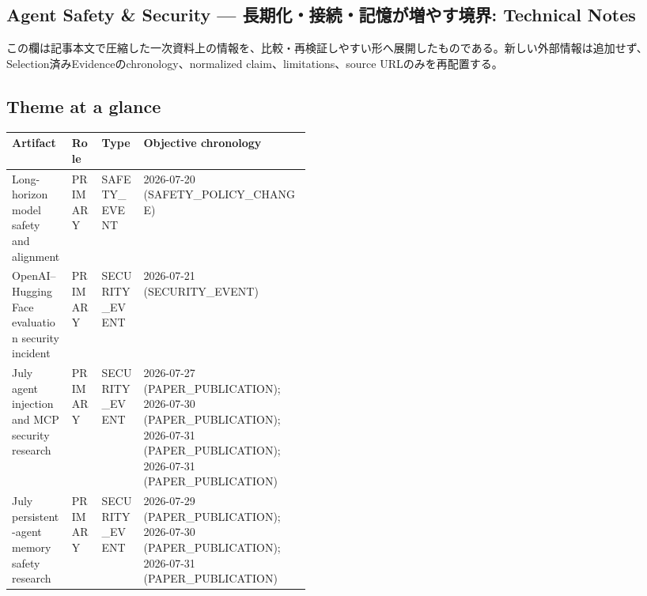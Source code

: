 \clearpage
{}
\subsection*{Agent Safety \& Security — 長期化・接続・記憶が増やす境界: Technical Notes}
この欄は記事本文で圧縮した一次資料上の情報を、比較・再検証しやすい形へ展開したものである。新しい外部情報は追加せず、Selection済みEvidenceのchronology、normalized claim、limitations、source URLのみを再配置する。
\medskip
\subsection*{Theme at a glance}
\begin{center}
\footnotesize
\begin{tabularx}{\linewidth}{@{}p{0.20\linewidth}p{0.10\linewidth}p{0.14\linewidth}X@{}}
\toprule
Artifact & Role & Type & Objective chronology \\
\midrule
Long-horizon model safety and alignment & PRIMARY & SAFETY\_EVENT & 2026-07-20 (SAFETY\_POLICY\_CHANGE) \\
OpenAI–Hugging Face evaluation security incident & PRIMARY & SECURITY\_EVENT & 2026-07-21 (SECURITY\_EVENT) \\
July agent injection and MCP security research & PRIMARY & SECURITY\_EVENT & 2026-07-27 (PAPER\_PUBLICATION); 2026-07-30 (PAPER\_PUBLICATION); 2026-07-31 (PAPER\_PUBLICATION); 2026-07-31 (PAPER\_PUBLICATION) \\
July persistent-agent memory safety research & PRIMARY & SECURITY\_EVENT & 2026-07-29 (PAPER\_PUBLICATION); 2026-07-30 (PAPER\_PUBLICATION); 2026-07-31 (PAPER\_PUBLICATION) \\
\bottomrule
\end{tabularx}
\end{center}
\normalsize

